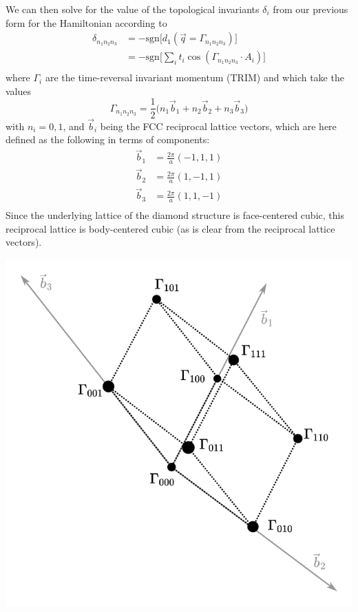 \documentclass[10pt,a4paper]{article}
\begin{document}
\begin{multicols}{2}
We can then solve for the value of the topological invariants $\delta_i$ from our previous form for the Hamiltonian according to
\begin{align*}
\delta_{n_1n_2n_3} & = -\text{sgn}\big[d_1(\vec{q}=\Gamma_{n_1n_2n_3})\big]\\
& = -\text{sgn}\big[\sum_{i}t_i\cos(\Gamma_{n_1n_2n_3}\cdot A_i)\big]\\
\end{align*}
where $\Gamma_i$ are the time-reversal invariant momentum (TRIM) and which take the values
$$
\Gamma_{n_1n_2n_3}=\frac{1}{2}\big(n_1\vec{b}_1+n_2\vec{b}_2+n_3\vec{b}_3\big)
$$
with $n_i=0,1$, and $\vec{b}_i$ being the FCC reciprocal lattice vectors, which are here defined as the following in terms of components:
\begin{align*}
\vec{b}_1 & = \frac{2\pi}{a}(-1,1,1)\\
\vec{b}_2 & = \frac{2\pi}{a}(1,-1,1)\\
\vec{b}_3 & = \frac{2\pi}{a}(1,1,-1)\\
\end{align*}
Since the underlying lattice of the diamond structure is face-centered cubic, this reciprocal lattice is body-centered cubic (as is clear from the reciprocal lattice vectors).
\begin{center}
\includegraphics[scale=0.5]{diamond_gamma.pdf}

\end{center}
\end{multicols}
\end{document}
